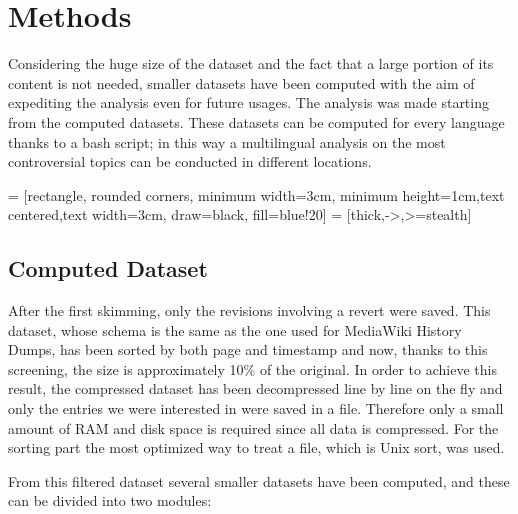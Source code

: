 \chapter{Methods}

Considering the huge size of the dataset and the fact that a large portion of its content is not
needed, smaller datasets have been computed with the aim of expediting the analysis even for future
usages. The analysis was made starting from the computed datasets. These datasets can be computed for
every language thanks to a bash script; in this way a multilingual analysis on the most
controversial topics can be conducted in different locations.


\bigskip



 = [rectangle, rounded corners, minimum width=3cm, minimum height=1cm,text centered,text width=3cm, draw=black, fill=blue!20]
 = [thick,->,>=stealth]


\bigskip

\section{Computed Dataset}
After the first skimming, only the revisions involving a revert were saved. This dataset, whose
schema is the same as the one used for MediaWiki History Dumps, has been sorted by both page and timestamp and now,
thanks to this screening, the size is approximately 10\% of the original. In order to achieve this result,
the compressed dataset has been decompressed line by line on the fly and only the entries we were
interested in were saved in a file. Therefore only a small amount of RAM and disk space is
required since all data is compressed. For the sorting part the most optimized way to treat a file,
which is Unix sort, was used.  

From this filtered dataset several smaller datasets have been computed, and these can be divided into two modules: 

